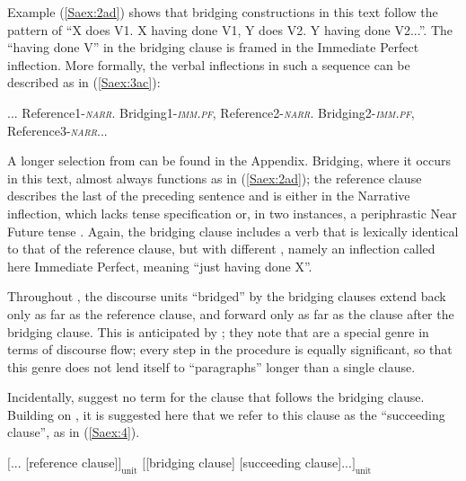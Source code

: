 \documentclass[output=paper]{LSP/langsci}
\begin{document}
Example (\ref{Saex:2ad}) shows that  bridging constructions in this text follow the pattern of ``X does V1. X having done V1, Y does V2. Y having done V2...''. The ``having done V'' in the bridging clause is framed in the Immediate Perfect inflection. More formally, the verbal inflections in such a sequence can be described as in (\ref{Saex:3ac}): 

\begin{exe}
\ex \label{Saex:3ac}
\begin{xlist}
\ex \label{Saex:3a}
\glt ... Reference1-\textit{\textsc{narr}}.
\ex \label{Saex:3b}
\glt Bridging1-\textit{\textsc{imm.pf}}, Reference2-\textit{\textsc{narr}}.
\ex \label{Saex:3c}
\glt Bridging2-\textit{\textsc{imm.pf}}, Reference3-\textit{\textsc{narr}}...
\end{xlist}
\end{exe}


A longer selection from \citet{Chesi2014} can be found in the Appendix. Bridging, where it occurs in this text, almost always functions as in (\ref{Saex:2ad}); the reference clause describes the last  of the preceding sentence and is either in the Narrative inflection, which lacks tense specification or, in two instances, a periphrastic Near Future tense \citep[see][]{Sarvasy2016}. Again, the bridging clause includes a verb that is lexically identical to that of the reference clause, but with different , namely an inflection called here Immediate Perfect, meaning ``just having done X''.

Throughout \citet{Chesi2014}, the discourse units ``bridged'' by the bridging clauses extend back only as far as the reference clause, and forward only as far as the clause after the bridging clause. This is anticipated by ; they note that  are a special genre in terms of discourse flow; every step in the procedure is equally significant, so that this genre does not lend itself to ``paragraphs'' longer than a single clause. 

Incidentally,  suggest no term for the clause that follows the bridging clause. Building on , it is suggested here that we refer to this clause as the ``succeeding clause'', as in (\ref{Saex:4}).

\begin{exe}
	\ex	\label{Saex:4}
		\glt	$\big[$... [reference clause]$\big]_{\text{unit}}$  $\big[$[bridging clause] [succeeding clause]...$\big]_{\text{unit}}$
\end{exe}
\end{document}
